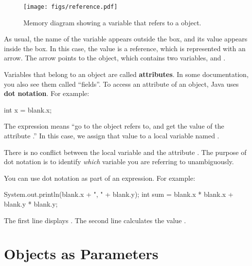 
\begin{figure}[!ht]
\begin{center}
\texttt{[image: figs/reference.pdf]}
\caption{Memory diagram showing a variable that refers to a  object.}
\label{fig.reference}
\end{center}
\end{figure}

As usual, the name of the variable  appears outside the box, and its value appears inside the box.
In this case, the value is a reference, which is represented with an arrow.
The arrow points to the  object, which contains two variables,  and .


\label{mutable-objects_attributes}


Variables that belong to an object are called {\bf attributes}.
In some documentation, you also see them called ``fields''.
To access an attribute of an object, Java uses {\bf dot notation}.
For example:

\begin{code}
int x = blank.x;
\end{code}

The expression  means ``go to the object  refers to, and get the value of the attribute .''
In this case, we assign that value to a local variable named .

There is no conflict between the local variable  and the attribute .
The purpose of dot notation is to identify {\em which} variable you are referring to unambiguously.

You can use dot notation as part of an expression.
For example:

\begin{code}
System.out.println(blank.x + ", " + blank.y);
int sum = blank.x * blank.x + blank.y * blank.y;
\end{code}

The first line displays .
The second line calculates the value .


\section{Objects as Parameters}
\label{mutable-objects_objects-as-parameters}

